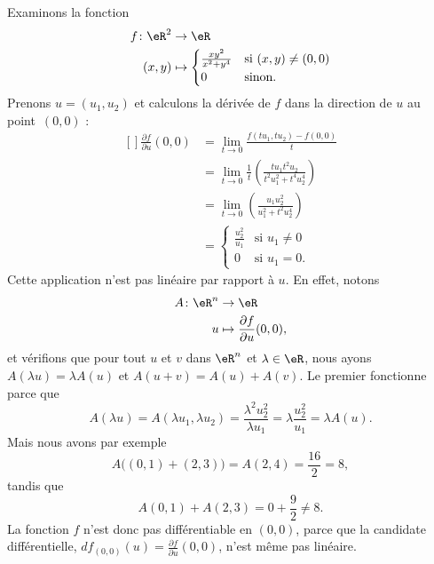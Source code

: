 \begin{example}     \label{Exemple0046Diff}
Examinons la fonction
\begin{equation}
    \begin{aligned}
        f\colon \eR^2&\to \eR \\
        (x,y)&\mapsto \begin{cases}
    \frac{ xy^2 }{ x^2+y^4 }    &   \text{si $(x,y)\neq (0,0)$}\\
    0   &    \text{sinon}.
\end{cases}
    \end{aligned}
\end{equation}
Prenons $u=(u_1,u_2)$ et calculons la dérivée de $f$ dans la direction de $u$ au point~$(0,0)$ :
\begin{equation}
    \begin{aligned}[]
        \frac{ \partial f }{ \partial u }(0,0)  
            &=\lim_{t\to 0}\frac{ f(tu_1,tu_2)-f(0,0) }{ t }\\
            &=\lim_{t\to 0}\frac{1}{ t }\left( \frac{ tu_1t^2u_2 }{ t^2u_1^2+t^4u_2^4 } \right)\\
            &=\lim_{t\to 0}\left( \frac{ u_1u_2^2 }{ u_1^2+t^2u_2^4 } \right)\\
            &=\begin{cases}
    \frac{ u_2^2 }{ u_1 }   &   \text{si $u_1\neq 0$}\\
    0   &    \text{si $u_1=0$}.
\end{cases}
    \end{aligned}
\end{equation}
Cette application n'est pas linéaire par rapport à $u$. En effet, notons
\begin{equation}
    \begin{aligned}
        A\colon \eR^n&\to \eR \\
        u&\mapsto \frac{ \partial f }{ \partial u }(0,0), 
    \end{aligned}
\end{equation}
et vérifions que pour tout $u$ et $v$ dans $\eR^n$ et $\lambda\in\eR$, nous ayons $A(\lambda u)=\lambda A(u)$ et $A(u+v)=A(u)+A(v)$. Le premier fonctionne parce que
\begin{equation}
    A(\lambda u)=A(\lambda u_1,\lambda u_2)=\frac{ \lambda^2 u_2^2 }{ \lambda u_1 }=\lambda\frac{ u_2^2 }{ u_1 }=\lambda A(u).
\end{equation}
Mais nous avons par exemple
\begin{equation}
    A\big( (0,1)+(2,3) \big)=A(2,4)=\frac{ 16 }{ 2 }=8,
\end{equation}
tandis que
\begin{equation}
    A(0,1)+A(2,3)=0+\frac{ 9 }{ 2 }\neq 8.
\end{equation}
La fonction $f$ n'est donc pas différentiable en $(0,0)$, parce que la candidate différentielle, $df_{(0,0)}(u)=\frac{ \partial f }{ \partial u }(0,0)$, n'est même pas linéaire.

\end{example}

